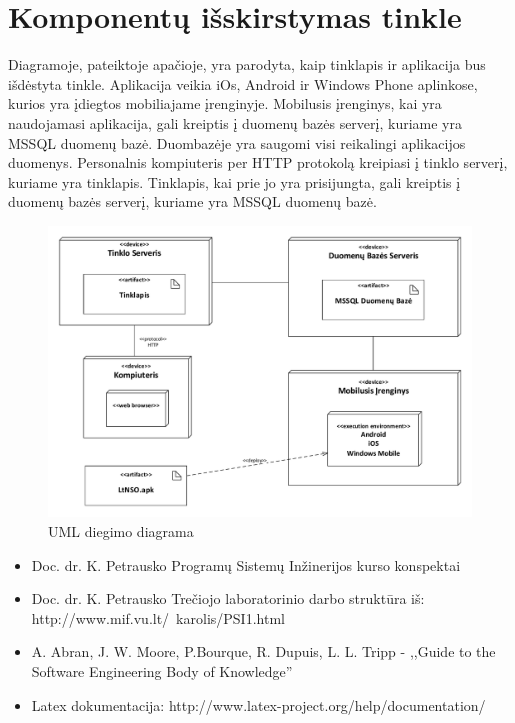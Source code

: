 \documentclass{VUMIFPSkursinis}
\begin{document}
    \section{Komponentų išskirstymas tinkle} \label{komponentuIsskirstymasTinkle}
		
		Diagramoje, pateiktoje apačioje, yra parodyta, kaip tinklapis ir aplikacija bus išdėstyta tinkle.
		Aplikacija veikia iOs, Android ir Windows Phone aplinkose, kurios yra įdiegtos mobiliajame įrenginyje.
		Mobilusis įrenginys, kai yra naudojamasi aplikacija, gali kreiptis į duomenų bazės serverį, kuriame yra MSSQL duomenų bazė.
		Duombazėje yra saugomi visi reikalingi aplikacijos duomenys.
		Personalnis kompiuteris per HTTP protokolą kreipiasi į tinklo serverį, kuriame yra tinklapis.
		Tinklapis, kai prie jo yra prisijungta, gali kreiptis į duomenų bazės serverį, kuriame yra MSSQL duomenų bazė.
		
        \begin{figure}[H]
			\centering
			\includegraphics[width=\textwidth]{img/DiegimoDiagrama}
			\caption{UML diegimo diagrama}
			\label{fig:UMLDiegimoDiagrama}
		\end{figure}
		
     \label{literaturosSarasas}
        \begin{itemize}
			\item Doc. dr. K. Petrausko Programų Sistemų Inžinerijos kurso konspektai
			\item Doc. dr. K. Petrausko Trečiojo laboratorinio darbo struktūra iš: http://www.mif.vu.lt/~karolis/PSI1.html
			\item A. Abran, J. W. Moore, P.Bourque, R. Dupuis, L. L. Tripp - ,,Guide to the Software Engineering Body of Knowledge''
			\item Latex dokumentacija: http://www.latex-project.org/help/documentation/
        \end{itemize}
\end{document}
